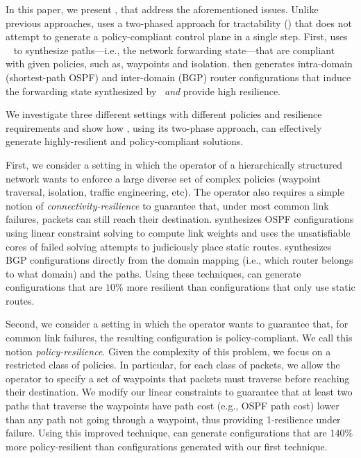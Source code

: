 In this paper, we present \name, 
that address the aforementioned issues.
Unlike previous approaches, \name uses a two-phased approach for tractability
() 
that does not attempt to generate 
a policy-compliant control plane in a single step.
First, \name 
uses \genesis~\cite{genesis}
to synthesize paths---i.e., the network forwarding state---that are compliant
with given policies, such as, waypoints and isolation.
\name then generates 
intra-domain (shortest-path OSPF) and inter-domain (BGP) router configurations
that induce the forwarding
state synthesized by \genesis\ {\em and} provide high resilience. 

We investigate three different settings with different policies and
resilience requirements and show how \name, using its two-phase
approach, can effectively generate highly-resilient and
policy-compliant solutions.

First, we consider a setting in which the operator of a hierarchically
structured network wants to enforce a large diverse set of complex
policies (waypoint traversal, isolation, traffic engineering, etc).
The operator also requires a simple notion of
\emph{connectivity-resilience} to guarantee that, under most common
link failures, packets can still reach their destination.
\name synthesizes OSPF configurations using linear constraint solving to compute
link weights and uses the unsatisfiable cores
of failed solving attempts to judiciously place static routes.
\name synthesizes BGP configurations directly 
from the domain mapping (i.e., which router belongs to what domain) and the paths.
Using these techniques, \name can generate configurations that are
$10\%$ more resilient than configurations that only use static routes.

Second, we consider a setting in which the operator 
wants to guarantee that, for common
link failures, the resulting configuration is policy-compliant.
We call this notion \emph{policy-resilience}.  Given the complexity of
this problem, we focus on a {\rm restricted class} of policies.  In
particular, for each class of packets, we allow the operator to
specify a set of waypoints that packets must traverse before reaching their
destination. 
We modify our linear constraints to guarantee that at least two paths
that traverse the waypoints have path cost (e.g., OSPF path cost)
lower than any path not going through a waypoint, thus providing
1-resilience under failure. Using this improved
technique, \name can generate configurations that are $140\%$ more
policy-resilient than configurations generated with our first
technique.

